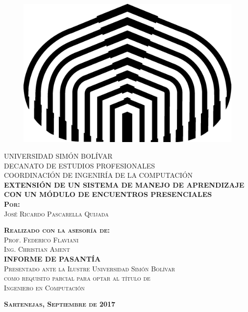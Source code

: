\thispagestyle{empty} %
\begin{center}

\begin{figure}[h]
\begin{center}
\includegraphics{Logos/logoUSB.png}
\end{center}
\end{figure}

\textsc{UNIVERSIDAD SIMÓN BOLÍVAR}\\
\textsc{DECANATO DE ESTUDIOS PROFESIONALES}\\
\textsc{COORDINACIÓN DE INGENIRÍA DE LA COMPUTACIÓN}\\[8em]

\textsc{\Large \textbf{EXTENSIÓN DE UN SISTEMA DE MANEJO DE APRENDIZAJE CON UN MÓDULO DE ENCUENTROS PRESENCIALES}}\\[4em]

\textsc{ \textbf{Por:} }\\
\textsc{José Ricardo Pascarella Quijada}

\textsc{ \textbf{Realizado con la asesoría de:} }\\
\textsc{Prof. Federico Flaviani }\\
\textsc{Ing. Christian Ament}\\[4em]

\textsc{ \textbf{INFORME DE PASANTÍA} }\\
\textsc{Presentado ante la Ilustre Universidad Simón Bolívar}\\
\textsc{como requisito parcial para optar al título de }\\
\textsc{Ingeniero en Computación}

\vspace*{\fill}

\textsc{ \textbf{Sartenejas, Septiembre de 2017} }
\end{center}
